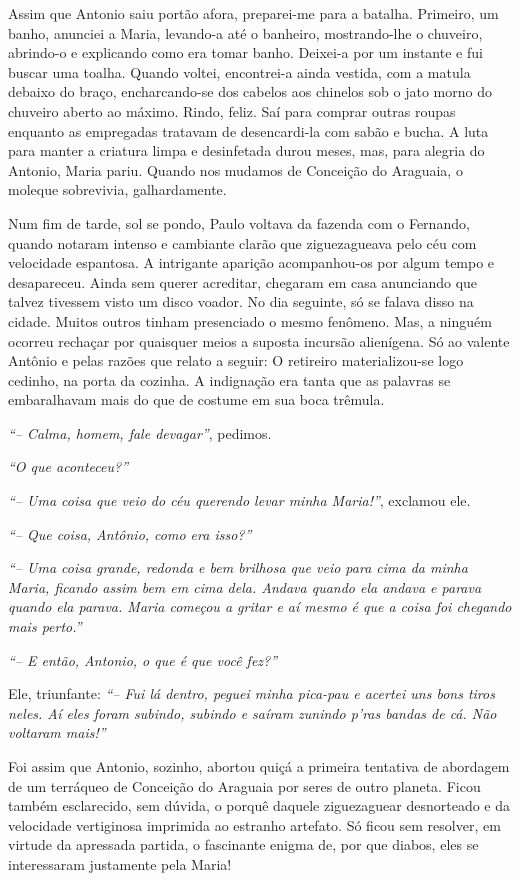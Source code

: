 Assim que Antonio saiu portão afora, preparei-me para a batalha.
Primeiro, um banho, anunciei a Maria, levando-a até o banheiro, mostrando-lhe o chuveiro, abrindo-o e explicando como era tomar banho.
Deixei-a por um instante e fui buscar uma toalha.
Quando voltei, encontrei-a ainda vestida, com a matula debaixo do braço, encharcando-se dos cabelos aos chinelos sob o jato morno do chuveiro aberto ao máximo.
Rindo, feliz.
Saí para comprar outras roupas enquanto as empregadas tratavam de desencardi-la com sabão e bucha.
A luta para manter a criatura limpa e desinfetada durou meses, mas, para alegria do Antonio, Maria pariu.
Quando nos mudamos de Conceição do Araguaia, o moleque sobrevivia, galhardamente.

Num fim de tarde, sol se pondo, Paulo voltava da fazenda com o Fernando, quando notaram intenso e cambiante clarão que ziguezagueava pelo céu com velocidade espantosa.
A intrigante aparição acompanhou-os por algum tempo e desapareceu.
Ainda sem querer acreditar, chegaram em casa anunciando que talvez tivessem visto um disco voador.
No dia seguinte, só se falava disso na cidade.
Muitos outros tinham presenciado o mesmo fenômeno.
Mas, a ninguém ocorreu rechaçar por quaisquer meios a suposta incursão alienígena.
Só ao valente Antônio e pelas razões que relato a seguir:
O retireiro materializou-se logo cedinho, na porta da cozinha.
A indignação era tanta que as palavras se embaralhavam mais do que de costume em sua boca trêmula.

\textit{``-- Calma, homem, fale devagar''}, pedimos.

\textit{``O que aconteceu?''}

\textit{``-- Uma coisa que veio do céu querendo levar minha Maria!''}, exclamou ele.

\textit{``-- Que coisa, Antônio, como era isso?''}

\textit{``-- Uma coisa grande, redonda e bem brilhosa que veio para cima da minha Maria, ficando assim bem em cima dela.
Andava quando ela andava e parava quando ela parava.
Maria começou a gritar e aí mesmo é que a coisa foi chegando mais perto.''}

\textit{``-- E então, Antonio, o que é que você fez?''}

Ele, triunfante:
\textit{``-- Fui lá dentro, peguei minha pica-pau e acertei uns bons tiros neles.
Aí eles foram subindo, subindo e saíram zunindo p’ras bandas de cá.
Não voltaram mais!''}

Foi assim que Antonio, sozinho, abortou quiçá a primeira tentativa de abordagem de um terráqueo de Conceição do Araguaia por seres de outro planeta.
Ficou também esclarecido, sem dúvida, o porquê daquele ziguezaguear desnorteado e da velocidade vertiginosa imprimida ao estranho artefato.
Só ficou sem resolver, em virtude da apressada partida, o fascinante enigma de, por que diabos, eles se interessaram justamente pela Maria!


